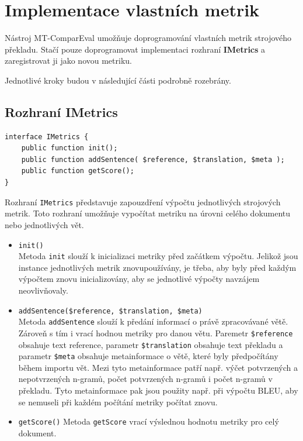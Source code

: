 \section{Implementace vlastních metrik}
\label{chap:own-metrics}

Nástroj \mbox{MT-ComparEval} umožňuje doprogramování vlastních metrik strojového překladu.
Stačí pouze doprogramovat implementaci rozhraní \textbf{IMetrics} a
  zaregistrovat ji jako novou metriku.

Jednotlivé kroky budou v následující části podrobně rozebrány.

\subsection{Rozhraní IMetrics}
\begin{verbatim}
interface IMetrics {
    public function init();
    public function addSentence( $reference, $translation, $meta );
    public function getScore();
}
\end{verbatim}

Rozhraní \texttt{IMetrics} představuje zapouzdření výpočtu jednotlivých strojových metrik.
Toto rozhraní umožňuje vypočítat metriku na úrovni celého dokumentu nebo jednotlivých vět.

\begin{itemize}
	\item \texttt{init()} \\
		Metoda \texttt{init} slouží k inicializaci metriky před začátkem výpočtu.	
		Jelikož jsou instance jednotlivých metrik znovupoužívány,
		  je třeba,
		  aby byly před každým výpočtem znovu inicializovány,
		  aby se jednotlivé výpočty navzájem neovlivňovaly.

	
	\item \texttt{addSentence(\$reference, \$translation, \$meta)} \\
		Metoda \texttt{addSentence} slouží k předání informací o právě zpracovávané větě.
		Zároveň s tím i vrací hodnou metriky pro danou větu.
		Paremetr \texttt{\$reference} obsahuje text reference, 
                  parametr \texttt{\$translation} obsahuje text překladu a
                  parametr \texttt{\$meta} obsahuje metainformace o větě,
                  které byly předpočítány během importu vět.
                Mezi tyto metainformace patří např. výčet potvrzených a nepotvrzených n-gramů,
                  počet potvrzených n-gramů i počet n-gramů v překladu.
		Tyto metainformace pak jsou použity např. při výpočtu BLEU,
		  aby se nemuseli při každém počítání metriky počítat znovu.

	\item \texttt{getScore()}
		Metoda \texttt{getScore} vrací výslednou hodnotu metriky pro celý dokument.
 
\end{itemize}


